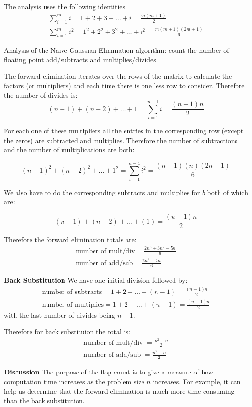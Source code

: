\documentclass [titlepage,12pt,letter] {article}
\begin{document}
The analysis uses the following identities: 
\begin{align*} 
\sum_{i=1}^{m} i = 1 + 2 + 3 + \dots + i = \frac{m(m+1)}{2} \\ 
\sum_{i=1}^{m} i^2 = 1^2 + 2^2 + 3^2 + \dots + i^2 = \frac{m(m+1)(2m+1)}{6}
\end{align*} 

Analysis of the Naive Gaussian Elimination algorithm: count the number
of floating point add/subtracts and multiplies/divides.

The forward elimination iterates over the rows of the matrix to
calculate the factors (or multipliers) and each time there is one less
row to consider. Therefore the number of divides is:
\[
(n-1) + (n-2) + \dots + 1 = \sum_{i=1}^{n-1} i = \frac{(n-1)n}{2} 
\]

For each one of these multipliers all the entries in the corresponding
row (except the zeros) are subtracted and multiplies. Therefore 
the number of subtractions and the number of multiplications are both: 

\[
(n-1)^2 + (n-2)^2 + \dots + 1^2 = \sum_{i=1}^{n-1} i^2 = \frac{(n-1)(n)(2n-1)}{6}
\]

We also have to do the corresponding subtracts and multiplies for $b$ both of which are: 

\[
(n-1) + (n-2) + \dots + (1) = \frac{(n-1)n}{2}
\]

Therefore the forward elimination totals are: 
\begin{align*} 
\mbox{number of mult/div} = \frac{2n^3 + 3n^2 -5n}{6} \\ 
\mbox{number of add/sub} = \frac{2n^3 - 2n}{6}
\end{align*} 

{\bf Back Substitution}
We have one initial division followed by: 
\begin{align*}
 \mbox{number of subtracts} = 1 + 2 + \dots + (n-1) = \frac{(n-1)n}{2} \\ 
\mbox{number of multiplies} = 1 + 2 + \dots + (n-1) = \frac{(n-1)n}{2}
\end{align*} 
\noindent 
with the last number of divides being $n-1$. 

Therefore for back substituion the total is: 
\begin{align*}
\mbox{number of mult/div } = \frac{n^2-n}{2} \\ 
\mbox{number of add/sub } = \frac{n^2-n}{2}
\end{align*}

{\bf Discussion} 
The purpose of the flop count is to give a measure of how computation
time increases as the problem size $n$ increases. For example, it can
help us determine that the forward elimination is much more time
consuming than the back substitution. 
\end{document}

